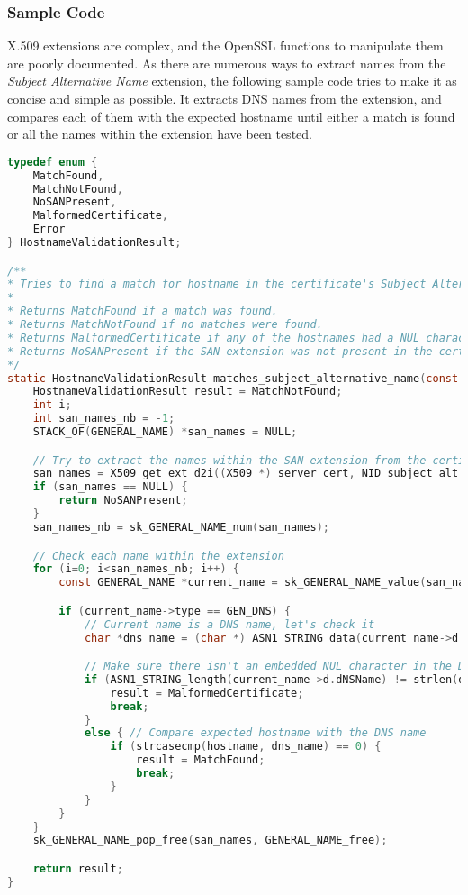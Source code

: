 \documentclass{article}
\begin{document}
\subsubsection{Sample Code}

X.509 extensions are complex, and the OpenSSL functions to manipulate them are
poorly documented. As there are numerous ways to extract names from the {\em
Subject Alternative Name} extension, the following sample code tries to make
it as concise and simple as possible. It extracts DNS names from the
extension, and compares each of them with the expected hostname until either a
match is found or all the names within the extension have been tested.

\begin{lstlisting}[style=code,language=C,numbers=none,caption={}]
typedef enum {
	MatchFound,
	MatchNotFound,
	NoSANPresent,
	MalformedCertificate,
	Error
} HostnameValidationResult;

/**
* Tries to find a match for hostname in the certificate's Subject Alternative Name extension.
*
* Returns MatchFound if a match was found.
* Returns MatchNotFound if no matches were found.
* Returns MalformedCertificate if any of the hostnames had a NUL character embedded in it.
* Returns NoSANPresent if the SAN extension was not present in the certificate.
*/
static HostnameValidationResult matches_subject_alternative_name(const char *hostname, const X509 *server_cert) {
	HostnameValidationResult result = MatchNotFound;
	int i;
	int san_names_nb = -1;
	STACK_OF(GENERAL_NAME) *san_names = NULL;

	// Try to extract the names within the SAN extension from the certificate
	san_names = X509_get_ext_d2i((X509 *) server_cert, NID_subject_alt_name, NULL, NULL);
	if (san_names == NULL) {
		return NoSANPresent;
	}
	san_names_nb = sk_GENERAL_NAME_num(san_names);

	// Check each name within the extension
	for (i=0; i<san_names_nb; i++) {
		const GENERAL_NAME *current_name = sk_GENERAL_NAME_value(san_names, i);

		if (current_name->type == GEN_DNS) {
			// Current name is a DNS name, let's check it
			char *dns_name = (char *) ASN1_STRING_data(current_name->d.dNSName);

			// Make sure there isn't an embedded NUL character in the DNS name
			if (ASN1_STRING_length(current_name->d.dNSName) != strlen(dns_name)) {
				result = MalformedCertificate;
				break;
			}
			else { // Compare expected hostname with the DNS name
				if (strcasecmp(hostname, dns_name) == 0) {
					result = MatchFound;
					break;
				}
			}
		}
	}
	sk_GENERAL_NAME_pop_free(san_names, GENERAL_NAME_free);

	return result;
}
\end{lstlisting}
\end{document}
